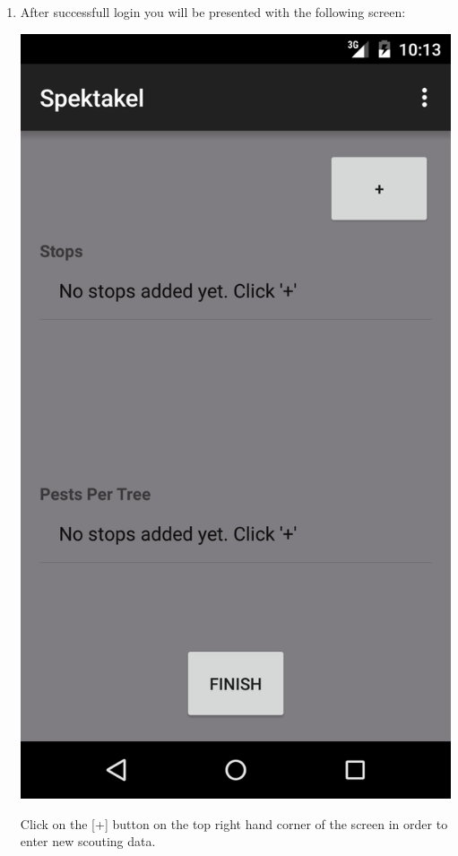 \documentclass[11pt,a4paper,titlepage]{article}
\begin{document}
\begin{enumerate}
\begin{center}
			\end{center}
		\item After successfull login you will be presented with the following screen:
			\begin{center}
				\includegraphics[scale=0.13]{shot2}
			\end{center}
			Click on the [+] button on the top right hand corner of the screen in order to enter new scouting data.


\end{enumerate}
\end{document}
